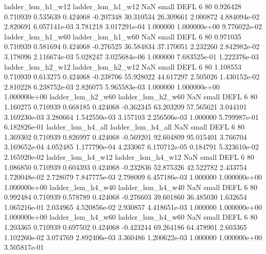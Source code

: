        ladder_lsm_h1_w12        ladder_lsm_h1_w12                   NaN      small     DEFL                 6 80 0.926428       0.710939 0.535639       0.424068   -0.207348     30.310534     26.309661     2.000872   4.884094e-02  2.820691 6.057141e-03     3.781218   3.017291e-04            1.000000    1.000000e+00        9.776022e-02
       ladder_lsm_h1_w60        ladder_lsm_h1_w60                   NaN      small     DEFL                 6 80 0.971035       0.710939 0.581694       0.424068   -0.276525     36.584834     37.170051     2.232260   2.842982e-02  3.178096 2.116674e-03     5.028247   3.025684e-06            1.000000    7.683525e-01        1.222376e-03
       ladder_lsm_h2_w12        ladder_lsm_h2_w12                   NaN      small     DEFL                 6 80 1.108553       0.710939 0.613275       0.424068   -0.238706     55.928022     44.617297     2.505026   1.430152e-02  2.810228 6.238752e-03     2.826075   5.965583e-03            1.000000    1.000000e+00        1.000000e+00
       ladder_lsm_h2_w60        ladder_lsm_h2_w60                   NaN      small     DEFL                 6 80 1.160275       0.710939 0.668185       0.424068   -0.362345     63.203209     57.565621     3.044101   3.169230e-03  3.280664 1.542550e-03     3.157103   2.256506e-03            1.000000    5.799987e-01        6.182826e-01
       ladder_lsm_h4_all        ladder_lsm_h4_all                   NaN      small     DEFL                 6 80 1.369302       0.710939 0.826997       0.424068   -0.569201     92.604809     95.015401     3.766704   3.169652e-04  4.052485 1.177790e-04     4.233067   6.170712e-05            0.184791    5.323610e-02        2.165920e-02
       ladder_lsm_h4_w12        ladder_lsm_h4_w12                   NaN      small     DEFL                 6 80 1.086850       0.710939 0.604393       0.424068   -0.232836     52.875326     42.522782     2.433754   1.720048e-02  2.728079 7.847775e-03     2.798009   6.457186e-03            1.000000    1.000000e+00        1.000000e+00
       ladder_lsm_h4_w40        ladder_lsm_h4_w40                   NaN      small     DEFL                 6 80 0.992484       0.710939 0.578789       0.424068   -0.276603     39.601860     36.485030     1.632654   1.065216e-01  2.034965 4.520856e-02     2.930857   4.418651e-03            1.000000    1.000000e+00        1.000000e+00
       ladder_lsm_h4_w60        ladder_lsm_h4_w60                   NaN      small     DEFL                 6 80 1.203365       0.710939 0.697502       0.424068   -0.423244     69.264186     64.478901     2.603365   1.102260e-02  3.074769 2.892406e-03     3.360486   1.200622e-03            1.000000    1.000000e+00        3.505817e-01
